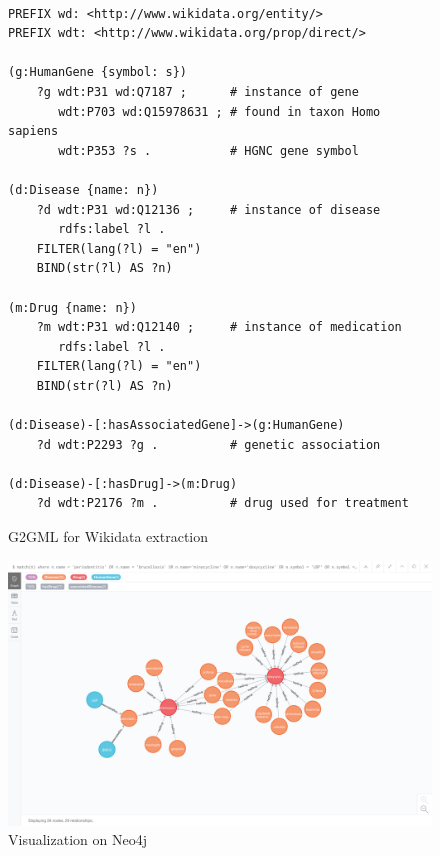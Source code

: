 \documentclass[runningheads]{llncs}
\begin{document}
\begin{figure}[!t]
\vspace{2mm}
\begin{scriptsize}
\begin{verbatim}

PREFIX wd: <http://www.wikidata.org/entity/>
PREFIX wdt: <http://www.wikidata.org/prop/direct/>

(g:HumanGene {symbol: s})
    ?g wdt:P31 wd:Q7187 ;      # instance of gene
       wdt:P703 wd:Q15978631 ; # found in taxon Homo sapiens
       wdt:P353 ?s .           # HGNC gene symbol

(d:Disease {name: n})
    ?d wdt:P31 wd:Q12136 ;     # instance of disease
       rdfs:label ?l .
    FILTER(lang(?l) = "en")
    BIND(str(?l) AS ?n)

(m:Drug {name: n})
    ?m wdt:P31 wd:Q12140 ;     # instance of medication
       rdfs:label ?l .
    FILTER(lang(?l) = "en")
    BIND(str(?l) AS ?n)

(d:Disease)-[:hasAssociatedGene]->(g:HumanGene)
    ?d wdt:P2293 ?g .          # genetic association

(d:Disease)-[:hasDrug]->(m:Drug)
    ?d wdt:P2176 ?m .          # drug used for treatment

\end{verbatim}
\end{scriptsize}
\caption{G2GML for Wikidata extraction}
\label{fig:g2gml_wikidata}
\end{figure}




\begin{figure}
\center
\includegraphics[width=1.0\textwidth]{neo4jexample2.png}
\caption{Visualization on Neo4j}
\label{fig:neo4jexample2.png}
\end{figure}
\end{document}
